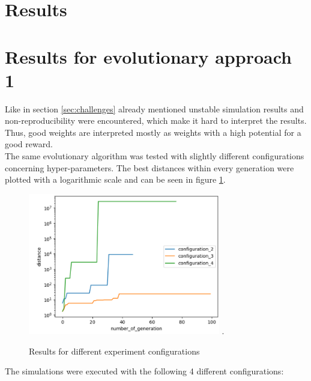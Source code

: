 \section{Results}
\label{sec:results}

\section{Results for evolutionary approach 1}
\label{sec:results_1}

Like in section \ref{sec:challenges} already mentioned unstable simulation results and non-reproducibility were encountered, which make it hard to interpret the results. Thus, good weights are interpreted mostly as weights with a high potential for a good reward.\\
The same evolutionary algorithm was tested with slightly different configurations concerning hyper-parameters. 
The best distances within every generation were plotted with a logarithmic scale and can be seen in figure \ref{fig:results_1}. 

\begin{figure}[H]
	\centering
	\includegraphics[width=3.3in]{img/results_1.png}
	\DeclareGraphicsExtensions.
	\caption{Results for different experiment configurations}
	\label{fig:results_1}
\end{figure}

The simulations were executed with the following 4 different configurations:\\

